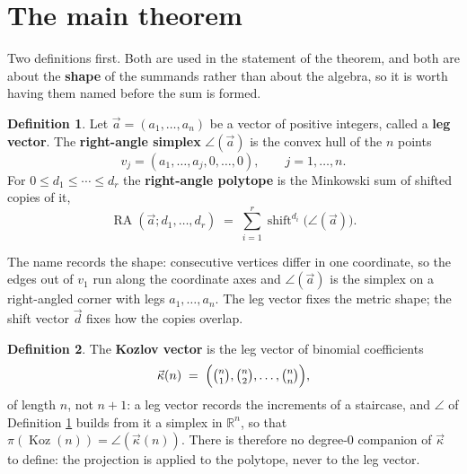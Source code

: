 \documentclass[11pt, a4paper, abstract=yes]{scrartcl}
\theoremstyle{definition}
\newtheorem{definition}{Definition}
\theoremstyle{remark}
\theoremstyle{plain}
\newcommand{\Koz}{\operatorname{Koz}}
\newcommand{\shift}{\operatorname{shift}}
\newcommand{\rasimp}{\angle}
\newcommand{\RA}{\operatorname{RA}}
\newcommand{\kozvec}{\vec\kappa}
\newcommand{\proj}{\pi}
\begin{document}
\section{The main theorem}
\label{sec-main}
Two definitions first. Both are used in the statement of the theorem, and both are about the
\textbf{shape} of the summands rather than about the algebra, so it is worth having them named before the
sum is formed.

\begin{definition}
Let \(\vec a=(a_1,\dots,a_n)\) be a vector of positive integers, called a \textbf{leg vector}. The
\textbf{right-angle simplex} \(\rasimp(\vec a)\) is the convex hull of the \(n\) points
\begin{equation}\label{eq:rasimp}
  v_j=(a_1,\dots,a_j,0,\dots,0),\qquad j=1,\dots,n .
\end{equation}
For \(0\le d_1\le\cdots\le d_r\) the \textbf{right-angle polytope} is the Minkowski sum of shifted copies
of it,
\begin{equation}\label{eq:rasimp-1}
  \RA(\vec a;d_1,\dots,d_r)\;=\;\sum_{i=1}^{r}\shift^{d_i}\bigl(\rasimp(\vec a)\bigr).
\end{equation}
\label{def-rasimp}
\end{definition}

The name records the shape: consecutive vertices differ in one coordinate, so the edges out of
\(v_1\) run along the coordinate axes and \(\rasimp(\vec a)\) is the simplex on a right-angled
corner with legs \(a_1,\dots,a_n\). The leg vector fixes the metric shape; the shift vector
\(\vec d\) fixes how the copies overlap.

\begin{definition}
The \textbf{Kozlov vector} is the leg vector of binomial coefficients
\begin{equation}\label{eq:kozvec}
  \kozvec(n)\;=\;\Bigl(\tbinom n1,\tbinom n2,\dots,\tbinom nn\Bigr),
\end{equation}
of length \(n\), not \(n+1\): a leg vector records the increments of a staircase, and
\(\rasimp\) of Definition \ref{def-rasimp} builds from it a simplex in \(\mathbb R^n\), so that
\(\proj(\Koz(n))=\rasimp(\kozvec(n))\). There is therefore no degree-\(0\) companion of
\(\kozvec\) to define: the projection is applied to the polytope, never to the leg vector.
\label{def:kozvec}
\label{def-kozvec}
\end{definition}
\end{document}
